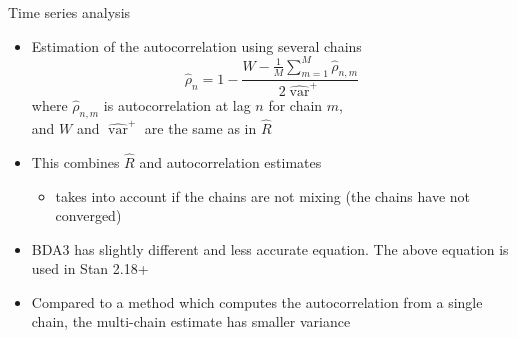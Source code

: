 \documentclass[finnish,english,t]{beamer}
\DeclareMathOperator{\var}{var}
\begin{document}
\begin{frame}{Time series analysis}

  \begin{itemize}
  \item Estimation of the autocorrelation using several chains
    \begin{equation*}
      \hat{\rho}_n=1-\frac{W - \frac{1}{M}\sum_{m=1}^M \hat{\rho}_{n,m}}{2\widehat{\var}^{+}}
    \end{equation*}
    where $\hat{\rho}_{n,m}$ is autocorrelation at lag $n$ for chain
    $m$,\\ and $W$ and $\widehat{\var}^{+}$ are the same as in
    $\widehat{R}$
  \item<2-> This combines $\widehat{R}$ and autocorrelation estimates
    \begin{itemize}
    \item takes into account if the chains are not mixing (the chains have not converged)
    \end{itemize}
  \item<3-> BDA3 has slightly different and less accurate equation. The
    above equation is used in Stan 2.18+
  \item<4-> Compared to a method which computes the autocorrelation
    from a single chain, the multi-chain estimate has smaller variance
 \end{itemize}
\end{frame}
\end{document}
